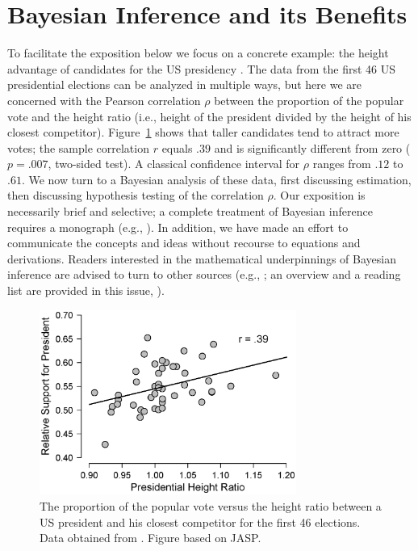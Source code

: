 \section{Bayesian Inference and its Benefits}
To facilitate the exposition below we focus on a concrete example: the height advantage of candidates for the US presidency \cite{StulpEtAl2013}. The data from the first 46 US presidential elections can be analyzed in multiple ways, but here we are concerned with the Pearson correlation $\rho$ between the proportion of the popular vote and the height ratio (i.e., height of the president divided by the height of his closest competitor). Figure~\ref{fig:bi1:PresidentsCorr} shows that taller candidates tend to attract more votes; the sample correlation $r$ equals $.39$ and is significantly different from zero ($p = .007$, two-sided test). A classical confidence interval for $\rho$ ranges from $.12$ to $.61$. We now turn to a Bayesian analysis of these data, first discussing estimation, then discussing hypothesis testing of the correlation $\rho$. Our exposition is necessarily brief and selective; a complete treatment of Bayesian inference requires a monograph (e.g., ). In addition, we have made an effort to communicate the concepts and ideas without recourse to equations and derivations. Readers interested in the mathematical underpinnings of Bayesian inference are advised to turn to other sources (e.g., ; an overview and a reading list are provided in this issue, ).

\begin{figure}[tbh]
    \begin{center}
        \includegraphics[width=0.75\textwidth]{figs/bi1_PresidentsCorr}
        \caption{The proportion of the popular vote versus the height ratio between a US president and his closest competitor for the first 46 elections. Data obtained from \protect {}. Figure based on JASP.}\label{fig:bi1:PresidentsCorr}
    \end{center}
\end{figure}

